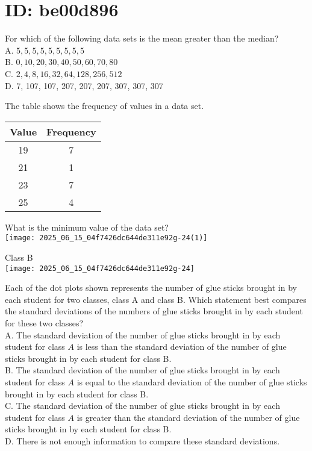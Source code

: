 \section*{ID: be00d896}
For which of the following data sets is the mean greater than the median?\\
A. $5,5,5,5,5,5,5,5,5$\\
B. $0,10,20,30,40,50,60,70,80$\\
C. $2,4,8,16,32,64,128,256,512$\\
D. 7, 107, 107, 207, 207, 207, 307, 307, 307

The table shows the frequency of values in a data set.

\begin{center}
\begin{tabular}{|c|c|}
\hline
Value & Frequency \\
\hline
19 & 7 \\
\hline
21 & 1 \\
\hline
23 & 7 \\
\hline
25 & 4 \\
\hline
\end{tabular}
\end{center}

What is the minimum value of the data set?\\
\texttt{[image: 2025\_06\_15\_04f7426dc644de311e92g-24(1)]}

Class B\\
\texttt{[image: 2025\_06\_15\_04f7426dc644de311e92g-24]}

Each of the dot plots shown represents the number of glue sticks brought in by each student for two classes, class A and class B. Which statement best compares the standard deviations of the numbers of glue sticks brought in by each student for these two classes?\\
A. The standard deviation of the number of glue sticks brought in by each student for class $A$ is less than the standard deviation of the number of glue sticks brought in by each student for class B.\\
B. The standard deviation of the number of glue sticks brought in by each student for class $A$ is equal to the standard deviation of the number of glue sticks brought in by each student for class B.\\
C. The standard deviation of the number of glue sticks brought in by each student for class $A$ is greater than the standard deviation of the number of glue sticks brought in by each student for class B.\\
D. There is not enough information to compare these standard deviations.

